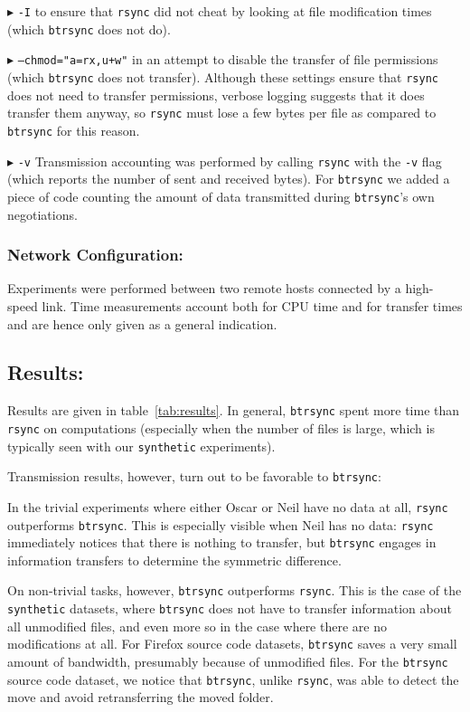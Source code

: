 \documentclass[11pt]{llncs}
\newcommand{\btrsync}{\texttt{btrsync}\xspace}
\newcommand{\rsync}{\texttt{rsync}\xspace}
\begin{document}
$\blacktriangleright$ {\tt -I} to ensure that \rsync did not cheat by looking at file modification times (which \btrsync does not do).\smallskip

$\blacktriangleright$ {\tt --chmod="a=rx,u+w"} in an attempt to disable the transfer of file permissions (which \btrsync does not transfer). Although these settings ensure that \rsync does not need to transfer permissions, verbose logging suggests that it does transfer them anyway, so \rsync must lose a few bytes per file as compared to \btrsync for this reason.\smallskip

$\blacktriangleright$ {\tt -v} Transmission accounting was performed by calling \rsync with the {\tt -v} flag (which reports the number of sent and received bytes). For \btrsync we added a piece of code counting the amount of data transmitted during \btrsync's own negotiations.\smallskip

\subsubsection{Network Configuration:} Experiments were performed between two remote hosts connected by a high-speed link. Time measurements account both for CPU time and for transfer times and are hence only given as a general indication.

\subsection{Results:}

Results are given in table~\ref{tab:results}. In general, \btrsync spent more time than \rsync on computations (especially when the number of files is large, which is typically seen with our {\tt synthetic} experiments).\smallskip

Transmission results, however, turn out to be favorable to \btrsync:

In the trivial experiments where either Oscar or Neil have no data at all, \rsync outperforms \btrsync. This is especially visible when Neil has no data: \rsync immediately notices that there is nothing to transfer, but \btrsync engages in information transfers to determine the symmetric difference.\smallskip

On non-trivial tasks, however, \btrsync outperforms \rsync. This is the case of the {\tt synthetic} datasets, where \btrsync does not have to transfer information about all unmodified files, and even more so in the case where there are no modifications at all. For Firefox source code datasets, \btrsync saves a very small amount of bandwidth, presumably because of unmodified files. For the \btrsync source code dataset, we notice that \btrsync, unlike \rsync, was able to detect the move and avoid retransferring the moved folder.
\end{document}
